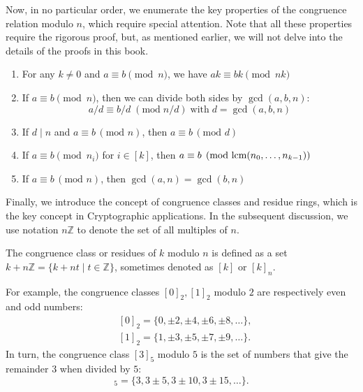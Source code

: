 \documentclass[../lecture-notes-148x210.tex]{subfiles}
\begin{document}
Now, in no particular order, we enumerate the key properties of the congruence relation modulo $n$, 
which require special attention. Note that all these properties require the rigorous proof,
but, as mentioned earlier, we will not delve into the details of the proofs in this book.

\begin{lemma}\label{lemma:congruence_scale}
    \hfill
    \begin{enumerate}
        \item For any $k \neq 0$ and $a \equiv b \pmod{n}$, we have $ak \equiv bk \pmod{nk}$
        \item If $a \equiv b \pmod{n}$, then we can divide both sides by $\gcd(a, b, n)$:
        \begin{equation*}
            a/d \equiv b/d \; (\text{mod}\; n/d) \; \text{with} \; d = \gcd(a,b,n)
        \end{equation*}
        \item If $d \mid n$ and $a \equiv b \, (\text{mod } n)$, then $a \equiv b \, (\text{mod } d)$
        \item If $a \equiv b \pmod{n_i}$ for $i \in [k]$, then $a \equiv b \pmod{\text{lcm}(n_0,\dots,n_{k-1})}$
        \item If $a \equiv b \, (\text{mod } n)$, then $\gcd(a, n) = \gcd(b, n)$
\end{enumerate}
\end{lemma}

Finally, we introduce the concept of congruence classes and residue rings, which is 
the key concept in Cryptographic applications. In the subsequent discussion, we use 
notation $n\mathbb{Z}$ to denote the set of all multiples of $n$.

\begin{definition}
    The congruence class or residues of $k$ modulo $n$ is defined as a set 
    $k + n\mathbb{Z} = \{ k + nt \mid t \in \mathbb{Z}\}$, sometimes denoted as $[k]$ or $[k]_n$.
\end{definition}

\begin{example}
    For example, the congruence classes $[0]_2, [1]_2$ modulo $2$ are
    respectively even and odd numbers:
    \begin{equation*}
        \begin{aligned}
        &[0]_2 = \{0, \pm 2, \pm 4, \pm 6, \pm 8, \ldots \}, \\
        &[1]_2 = \{1, \pm 3, \pm 5, \pm 7, \pm 9, \ldots \}.
        \end{aligned}
    \end{equation*}
    In turn, the congruence class $[3]_5$ modulo $5$ is the set of numbers that
    give the remainder $3$ when divided by $5$:
    \begin{equation*}
        [3]_5 = \{3, 3 \pm 5, 3 \pm 10, 3 \pm 15, \ldots \}.
    \end{equation*}
\end{example}
\end{document}
